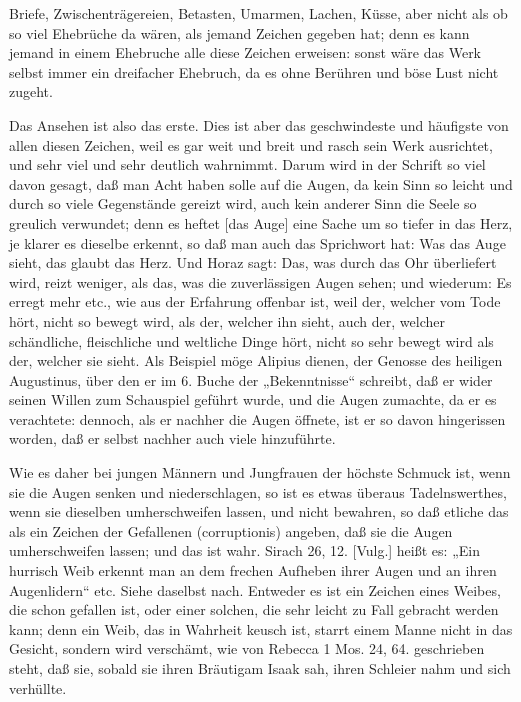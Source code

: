 Briefe, Zwischenträgereien, Betasten, Umarmen, Lachen, Küsse, aber nicht als ob so viel Ehebrüche da wären, als jemand Zeichen gegeben hat; denn es kann jemand in einem Ehebruche alle diese Zeichen erweisen: sonst wäre das Werk selbst immer ein dreifacher Ehebruch, da es ohne Berühren und böse Lust nicht zugeht.

Das Ansehen ist also das erste. Dies ist aber das geschwindeste und häufigste von allen diesen Zeichen, weil es gar weit und breit und rasch sein Werk ausrichtet, und sehr viel und sehr deutlich wahrnimmt. Darum wird in der Schrift so viel davon gesagt, daß man Acht haben solle auf die Augen, da kein Sinn so leicht und durch so viele Gegenstände gereizt wird, auch kein anderer Sinn die Seele so greulich verwundet; denn es heftet [das Auge] eine Sache um so tiefer in das Herz, je klarer es dieselbe erkennt, so daß man auch das Sprichwort hat: Was das Auge sieht, das glaubt das Herz. Und Horaz sagt: Das, was durch das Ohr überliefert wird, reizt weniger, als das, was die zuverlässigen Augen sehen; und wiederum: Es erregt mehr etc., wie aus der Erfahrung offenbar ist, weil der, welcher vom Tode hört, nicht so bewegt wird, als der, welcher ihn sieht, auch der, welcher schändliche, fleischliche und weltliche Dinge hört, nicht so sehr bewegt wird als der, welcher sie sieht. Als Beispiel möge Alipius dienen, der Genosse des heiligen Augustinus, über den er im 6. Buche der „Bekenntnisse“ schreibt, daß er wider seinen Willen zum Schauspiel geführt wurde, und die Augen zumachte, da er es verachtete: dennoch, als er nachher die Augen öffnete, ist er so davon hingerissen worden, daß er selbst nachher auch viele hinzuführte.

Wie es daher bei jungen Männern und Jungfrauen der höchste Schmuck ist, wenn sie die Augen senken und niederschlagen, so ist es etwas überaus Tadelnswerthes, wenn sie dieselben umherschweifen lassen, und nicht bewahren, so daß etliche das als ein Zeichen der Gefallenen (corruptionis) angeben, daß sie die Augen umherschweifen lassen; und das ist wahr. Sirach 26, 12. [Vulg.] heißt es: „Ein hurrisch Weib erkennt man an dem frechen Aufheben ihrer Augen und an ihren Augenlidern“ etc. Siehe daselbst nach. Entweder es ist ein Zeichen eines Weibes, die schon gefallen ist, oder einer solchen, die sehr leicht zu Fall gebracht werden kann; denn ein Weib, das in Wahrheit keusch ist, starrt einem Manne nicht in das Gesicht, sondern wird verschämt, wie von Rebecca 1 Mos. 24, 64. geschrieben steht, daß sie, sobald sie ihren Bräutigam Isaak sah, ihren Schleier nahm und sich verhüllte.

